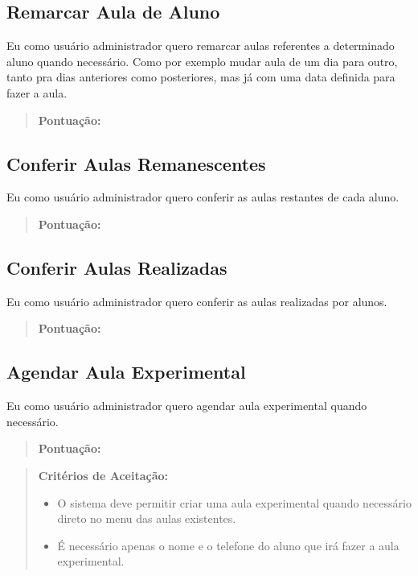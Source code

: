 \subsection[Remarcar Aula de Aluno]{Remarcar Aula de Aluno}
Eu como usuário administrador quero remarcar aulas referentes a determinado
aluno quando necessário. Como por exemplo mudar aula de um dia para outro,
tanto pra dias anteriores como posteriores, mas já com uma data definida
para fazer a aula.
\begin{quote}
    \textbf{Pontuação:}
\end{quote}

\subsection[Conferir Aulas Remanescentes]{Conferir Aulas Remanescentes}
Eu como usuário administrador quero conferir as aulas restantes de cada aluno.
\begin{quote}
    \textbf{Pontuação:}
\end{quote}

\subsection[Conferir Aulas Realizadas]{Conferir Aulas Realizadas}
Eu como usuário administrador quero conferir as aulas realizadas por alunos.
\begin{quote}
    \textbf{Pontuação:}
\end{quote}

\subsection[Agendar Aula Experimental]{Agendar Aula Experimental}
Eu como usuário administrador quero agendar aula experimental quando necessário.
\begin{quote}
    \textbf{Pontuação:}
\end{quote}
\begin{quote}
\textbf{Critérios de Aceitação:}
    \begin{itemize}
        \item O sistema deve permitir criar uma aula experimental quando necessário direto
        no menu das aulas existentes.
        \item É necessário apenas o nome e o telefone do aluno que irá fazer a aula
        experimental.
    \end{itemize}
\end{quote}

